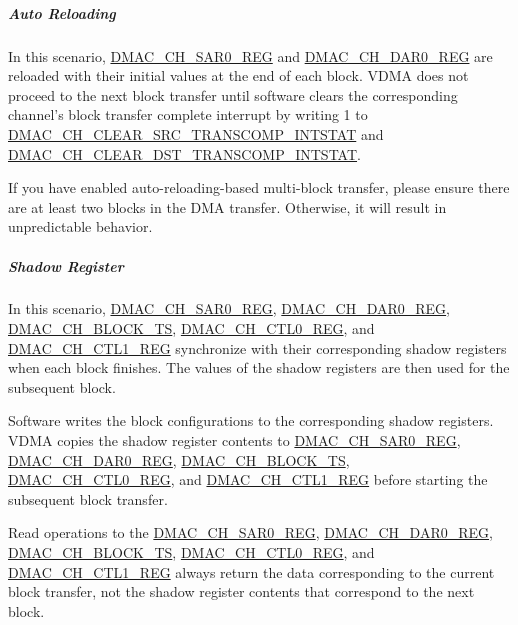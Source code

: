 \documentclass[main\_\_EN.tex]{subfiles}
\begin{document}
\subparagraph{Auto Reloading}

In this scenario, \hyperref[regdesc:DMACCHNSAR0REG]{DMAC\_CH\_SAR0\_REG} and \hyperref[regdesc:DMACCHNDAR0REG]{DMAC\_CH\_DAR0\_REG} are reloaded with their initial values at the end of each block. VDMA does not proceed to the next block transfer until software clears the corresponding channel’s block transfer complete interrupt by writing 1 to \hyperref[fielddesc:DMACCHNCLEARSRCTRANSCOMPINTSTAT]{DMAC\_CH\_CLEAR\_SRC\_TRANSCOMP\_INTSTAT} and \hyperref[fielddesc:DMACCHNCLEARDSTTRANSCOMPINTSTAT]{DMAC\_CH\_CLEAR\_DST\_TRANSCOMP\_INTSTAT}.

\begin{tiplisting}
    If you have enabled auto-reloading-based multi-block transfer, please ensure there are at least two blocks in the DMA transfer. Otherwise, it will result in unpredictable behavior.
\end{tiplisting}

\subparagraph{Shadow Register}

In this scenario, \hyperref[regdesc:DMACCHNSAR0REG]{DMAC\_CH\_SAR0\_REG}, \hyperref[regdesc:DMACCHNDAR0REG]{DMAC\_CH\_DAR0\_REG}, \hyperref[fielddesc:DMACCHNBLOCKTS]{DMAC\_CH\_BLOCK\_TS}, \hyperref[regdesc:DMACCHNCTL0REG]{DMAC\_CH\_CTL0\_REG}, and \hyperref[regdesc:DMACCHNCTL1REG]{DMAC\_CH\_CTL1\_REG} synchronize with their corresponding shadow registers when each block finishes. The values of the shadow registers are then used for the subsequent block.

Software writes the block configurations to the corresponding shadow registers. VDMA copies the shadow register contents to \hyperref[regdesc:DMACCHNSAR0REG]{DMAC\_CH\_SAR0\_REG}, \hyperref[regdesc:DMACCHNDAR0REG]{DMAC\_CH\_DAR0\_REG}, \hyperref[fielddesc:DMACCHNBLOCKTS]{DMAC\_CH\_BLOCK\_TS}, \hyperref[regdesc:DMACCHNCTL0REG]{DMAC\_CH\_CTL0\_REG}, and \hyperref[regdesc:DMACCHNCTL1REG]{DMAC\_CH\_CTL1\_REG}  before starting the subsequent block transfer.

Read operations to the \hyperref[regdesc:DMACCHNSAR0REG]{DMAC\_CH\_SAR0\_REG}, \hyperref[regdesc:DMACCHNDAR0REG]{DMAC\_CH\_DAR0\_REG}, \hyperref[fielddesc:DMACCHNBLOCKTS]{DMAC\_CH\_BLOCK\_TS}, \hyperref[regdesc:DMACCHNCTL0REG]{DMAC\_CH\_CTL0\_REG}, and \hyperref[regdesc:DMACCHNCTL1REG]{DMAC\_CH\_CTL1\_REG} always return the
data corresponding to the current block transfer, not the shadow register contents that correspond to the next block.
\end{document}
